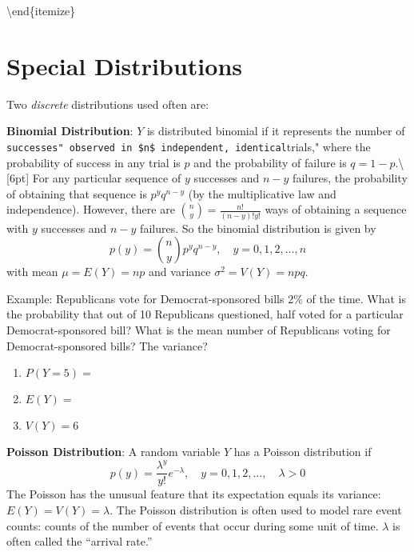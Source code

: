 \documentclass[]{book}
\theoremstyle{definition}
\theoremstyle{definition}
\theoremstyle{definition}
\theoremstyle{remark}
\begin{document}
\textbackslash{}end\{itemize\}

\section{Special Distributions}\label{special-distributions}

Two \emph{discrete} distributions used often are:

\textbf{Binomial Distribution}: \(Y\) is distributed binomial if it
represents the number of
\texttt{successes"\ observed\ in\ \$n\$\ independent,\ identical}trials,"
where the probability of success in any trial is \(p\) and the
probability of failure is \(q=1-p\).\textbackslash{}{[}6pt{]} For any
particular sequence of \(y\) successes and \(n-y\) failures, the
probability of obtaining that sequence is \(p^y q^{n-y}\) (by the
multiplicative law and independence). However, there are
\(\binom{n}{y}=\frac{n!}{(n-y)!y!}\) ways of obtaining a sequence with
\(y\) successes and \(n-y\) failures. So the binomial distribution is
given by \[p(y)=\binom{n}{y}p^y q^{n-y}, \quad y=0,1,2,\ldots,n\] with
mean \(\mu=E(Y)=np\) and variance \(\sigma^2=V(Y)=npq\).

\begin{framed}
Example: Republicans vote for Democrat-sponsored bills 2\% of the time. What is the probability that out of 10 Republicans questioned, half voted for a particular Democrat-sponsored bill?  What is the mean number of Republicans voting for Democrat-sponsored bills?  The variance?\\
  \parbox[c]{4.25in}{
  \begin{enumerate}
  \item $P(Y=5)=$
  \item $E(Y)=$ 
  \item $V(Y)=6$
  \end{enumerate}}
  \begin{comment}
  \parbox{1.5in}{\hfill \epsffile{binopmf.eps}}
  \end{comment}
\end{framed}

\textbf{Poisson Distribution}: A random variable \(Y\) has a Poisson
distribution if
\[p(y)=\frac{\lambda^y}{y!}e^{-\lambda}, \quad y=0,1,2,\ldots, \quad \lambda>0\]
The Poisson has the unusual feature that its expectation equals its
variance: \(E(Y)=V(Y)=\lambda\). The Poisson distribution is often used
to model rare event counts: counts of the number of events that occur
during some unit of time. \(\lambda\) is often called the ``arrival
rate.''
\end{document}
